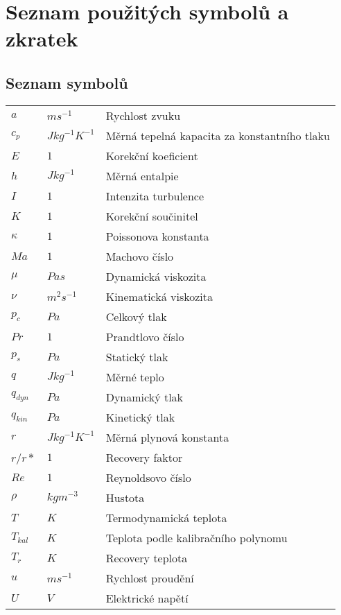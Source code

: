 \thispagestyle{empty}
\section*{Seznam použitých symbolů a zkratek}
\subsection*{Seznam symbolů}
    \begin{table}[ht!]
        \begin{tabular}{P{.15\textwidth}|P{.15\textwidth}|p{.60\textwidth}}
        $a$ & $ms^{-1}$ &Rychlost zvuku \\
        $c_p$ &$Jkg^{-1}K^{-1}$ & Měrná tepelná kapacita za konstantního tlaku \\
        $E$ &$1$ & Korekční koeficient \\
        $h$ &$Jkg^{-1}$ & Měrná entalpie \\
        $I$ &$1$ & Intenzita turbulence \\
        $K$ &$1$ & Korekční součinitel \\
        $\kappa$ &$1$ & Poissonova konstanta \\
        $Ma$ &$1$ & Machovo číslo \\
        $\mu$ &$Pas$ & Dynamická viskozita \\
        $\nu$ &$m^2s^{-1}$ & Kinematická viskozita \\
        $p_c$ & $Pa$ & Celkový tlak \\
        $Pr$ & $1$ & Prandtlovo číslo \\
        $p_s$ & $Pa$ & Statický tlak \\
        $q$ & $Jkg^{-1}$ & Měrné teplo \\
        $q_{dyn}$ & $Pa$ & Dynamický tlak \\
        $q_{kin}$ & $Pa$ & Kinetický tlak \\
        $r$ & $Jkg^{-1}K^{-1}$ & Měrná plynová konstanta \\
        $r$/$r*$ & $1$ & Recovery faktor \\
        $Re$ & $1$ & Reynoldsovo číslo \\
        $\rho$ & $kgm^{-3}$ & Hustota \\
        $T$ & $K$ & Termodynamická teplota \\
        $T_{kal}$ & $K$ & Teplota podle kalibračního polynomu \\
        $T_r$ & $K$ & Recovery teplota \\
        $u$ & $ms^{-1}$ & Rychlost proudění \\
        $U$ & $V$ & Elektrické napětí
        \end{tabular}
    \end{table}
